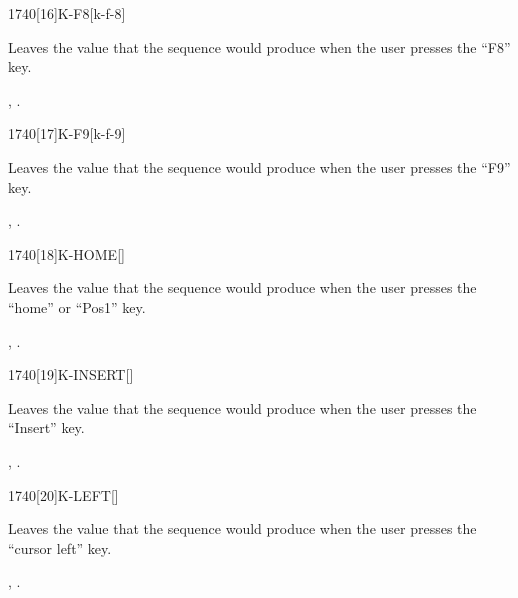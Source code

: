 \begin{worddef}{1740}[16]{K-F8}[k-f-8]%
\item {}

	Leaves the value  that the sequence 
	 would produce when the user presses the
	``F8'' key.

\see {},
	.
\end{worddef}


\begin{worddef}{1740}[17]{K-F9}[k-f-9]%
\item {}

	Leaves the value  that the sequence 
	 would produce when the user presses the
	``F9'' key.

\see {},
	.
\end{worddef}


\begin{worddef}{1740}[18]{K-HOME}[]%
\item {}

	Leaves the value  that the sequence 
	 would produce when the user presses the
	``home'' or ``Pos1'' key.

\see {},
	.
\end{worddef}


\begin{worddef}{1740}[19]{K-INSERT}[]%
\item {}

	Leaves the value  that the sequence 
	 would produce when the user presses the
	``Insert'' key.

\see {},
	.
\end{worddef}


\begin{worddef}{1740}[20]{K-LEFT}[]%
\item {}

	Leaves the value  that the sequence 
	 would produce when the user presses the
	``cursor left'' key.

\see {},
	.
\end{worddef}


